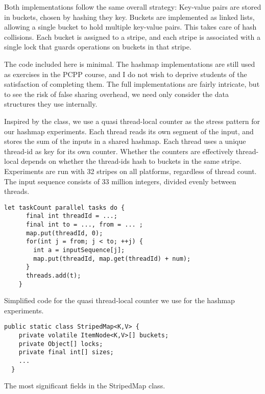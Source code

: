 Both implementations follow the same overall strategy: Key-value pairs are
stored in buckets, chosen by hashing they key. Buckets are implemented as linked
lists, allowing a single bucket to hold multiple key-value pairs. This
takes care of hash collisions. Each bucket is assigned to a stripe, and each
stripe is associated with a single lock that guards operations on buckets in
that stripe.

The code included here is minimal. The hashmap implementations are still used as
exercises in the PCPP course, and I do not wish to deprive students of the
satisfaction of completing them. The full implementations are fairly intricate,
but to see the risk of false sharing overhead, we need only consider the data
structures they use internally.

Inspired by the 
class\footnotemark{}, we use a quasi thread-local counter as the stress pattern for our hashmap
experiments. Each thread reads its own segment of the input, and stores the sum
of the inputs in a shared hashmap. Each thread uses a unique thread-id as key
for its own counter. Whether the counters are effectively thread-local depends
on whether the thread-ids hash to buckets in the same stripe.
Experiments are run with 32 stripes on all platforms, regardless of thread
count. The input sequence consists of 33 million integers, divided evenly
between threads.


\begin{code}
\begin{Verbatim}[frame=single]
  let taskCount parallel tasks do {
      final int threadId = ...;
      final int to = ..., from = ... ;
      map.put(threadId, 0);
      for(int j = from; j < to; ++j) {
        int a = inputSequence[j];
        map.put(threadId, map.get(threadId) + num);
      }
      threads.add(t);
    }
\end{Verbatim}
	\caption{Simplified code for the quasi thread-local counter we use for
	the hashmap experiments.}
\end{code}

\begin{code}
\begin{Verbatim}[frame=single]
  public static class StripedMap<K,V> {
    private volatile ItemNode<K,V>[] buckets;
    private Object[] locks;
    private final int[] sizes;
    ...
  }
\end{Verbatim}
	\caption{The most significant fields in the StripedMap class.}
\end{code}

